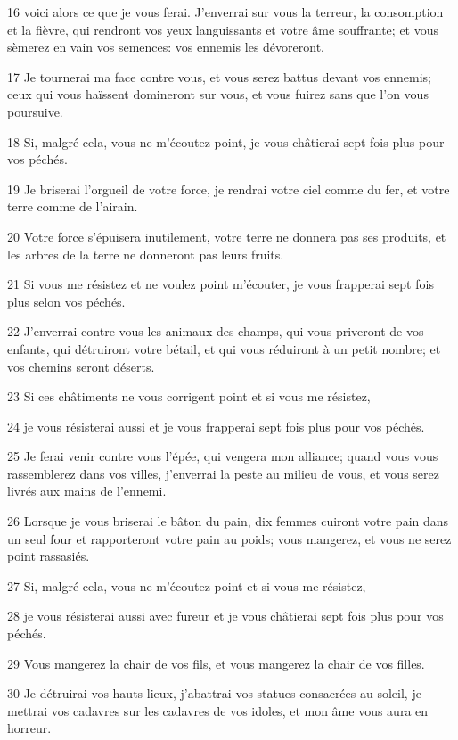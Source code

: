 \par 16 voici alors ce que je vous ferai. J'enverrai sur vous la terreur, la consomption et la fièvre, qui rendront vos yeux languissants et votre âme souffrante; et vous sèmerez en vain vos semences: vos ennemis les dévoreront.
\par 17 Je tournerai ma face contre vous, et vous serez battus devant vos ennemis; ceux qui vous haïssent domineront sur vous, et vous fuirez sans que l'on vous poursuive.
\par 18 Si, malgré cela, vous ne m'écoutez point, je vous châtierai sept fois plus pour vos péchés.
\par 19 Je briserai l'orgueil de votre force, je rendrai votre ciel comme du fer, et votre terre comme de l'airain.
\par 20 Votre force s'épuisera inutilement, votre terre ne donnera pas ses produits, et les arbres de la terre ne donneront pas leurs fruits.
\par 21 Si vous me résistez et ne voulez point m'écouter, je vous frapperai sept fois plus selon vos péchés.
\par 22 J'enverrai contre vous les animaux des champs, qui vous priveront de vos enfants, qui détruiront votre bétail, et qui vous réduiront à un petit nombre; et vos chemins seront déserts.
\par 23 Si ces châtiments ne vous corrigent point et si vous me résistez,
\par 24 je vous résisterai aussi et je vous frapperai sept fois plus pour vos péchés.
\par 25 Je ferai venir contre vous l'épée, qui vengera mon alliance; quand vous vous rassemblerez dans vos villes, j'enverrai la peste au milieu de vous, et vous serez livrés aux mains de l'ennemi.
\par 26 Lorsque je vous briserai le bâton du pain, dix femmes cuiront votre pain dans un seul four et rapporteront votre pain au poids; vous mangerez, et vous ne serez point rassasiés.
\par 27 Si, malgré cela, vous ne m'écoutez point et si vous me résistez,
\par 28 je vous résisterai aussi avec fureur et je vous châtierai sept fois plus pour vos péchés.
\par 29 Vous mangerez la chair de vos fils, et vous mangerez la chair de vos filles.
\par 30 Je détruirai vos hauts lieux, j'abattrai vos statues consacrées au soleil, je mettrai vos cadavres sur les cadavres de vos idoles, et mon âme vous aura en horreur.

